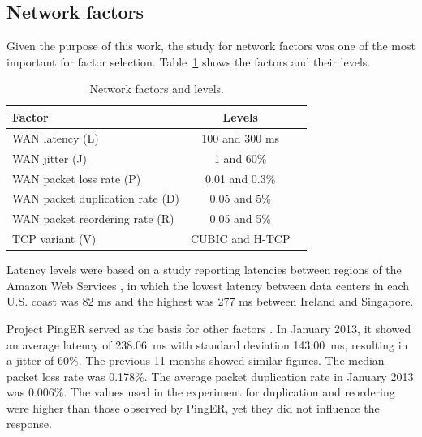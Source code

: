 \documentclass[man,floatsintext,12pt]{apa6}
\begin{document}
\subsection{Network factors}

Given the purpose of this work, the study for network factors was one of the
most important for factor selection. Table~\ref{tab:network_factors_and_levels}
shows the factors and their levels.

\begin{table}[h!]
\caption{Network factors and levels.}
\label{tab:network_factors_and_levels}
\begin{tabular}{lcc} \toprule

Factor & Levels \\ \midrule

WAN latency (L) & 100 and 300 ms \\

WAN jitter (J) & 1 and 60\% \\

WAN packet loss rate (P) & 0.01 and 0.3\% \\

WAN packet duplication rate (D) & 0.05 and 5\% \\

WAN packet reordering rate (R) & 0.05 and 5\% \\

TCP variant (V) & CUBIC and H-TCP\\ \bottomrule

\end{tabular}  
\end{table}

Latency levels were based on a study reporting latencies between regions of the
Amazon Web Services \parencite{Sovran2011}, in which the lowest latency between data
centers in each U.S. coast was 82 ms and the highest was 277 ms between Ireland
and Singapore.

Project PingER served as the basis for other factors \parencite{PingER2013}. In
January 2013, it showed an average latency of 238.06~ms with standard deviation
143.00~ms, resulting in a jitter of 60\%. The previous 11 months showed similar
figures. The median packet loss rate was 0.178\%. The average packet
duplication rate in January 2013 was 0.006\%. The values used in the experiment
for duplication and reordering were higher than those observed by PingER, yet
they did not influence the response.
\end{document}
